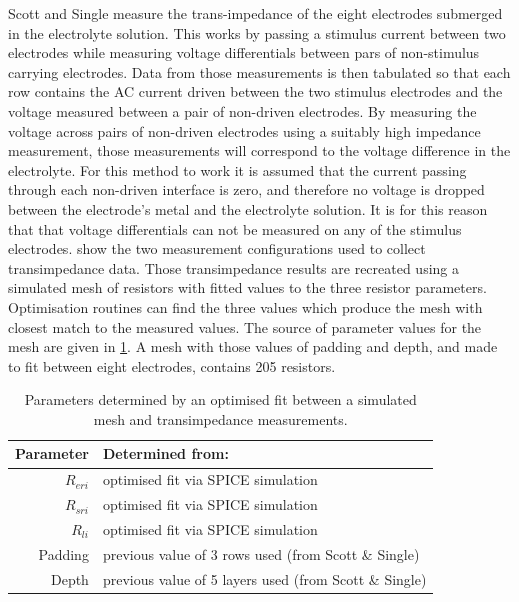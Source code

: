     Scott and Single measure the trans-impedance of the eight electrodes submerged in the electrolyte solution.
    This works by passing a stimulus current between two electrodes while measuring voltage differentials between pars of non-stimulus carrying electrodes.
    Data from those measurements is then tabulated so that each row contains the AC current driven between the two stimulus electrodes and the voltage measured between a pair of non-driven electrodes.
    By measuring the voltage across pairs of non-driven electrodes using a suitably high impedance measurement, those measurements will correspond to the voltage difference in the electrolyte.
    For this method to work it is assumed that the current passing through each non-driven interface is zero, and therefore no voltage is dropped between the electrode's metal and the electrolyte solution.
    It is for this reason that that voltage differentials can not be measured on any of the stimulus electrodes.
     show the two measurement configurations used to collect transimpedance data.
    Those transimpedance results are recreated using a simulated mesh of resistors with fitted values to the three resistor parameters.
    Optimisation routines can find the three values which produce the mesh with closest match to the measured values.
    The source of parameter values for the mesh are given in \cref{tab:pt2-parameterDesc-ResistorMesh}.
    A mesh with those values of padding and depth, and made to fit between eight electrodes, contains 205 resistors.


    \begin{table}
      \begin{center}
        \begin{tabular} {r | l}
          Parameter & Determined from:\\
          \hline
          $R_{eri}$ & optimised fit via SPICE simulation\\
          $R_{sri}$ & optimised fit via SPICE simulation\\
          $R_{li}$ & optimised fit via SPICE simulation\\
          Padding & previous value of 3 rows used (from Scott \& Single)\\
          Depth & previous value of 5 layers used (from Scott \& Single)
        \end{tabular}
      \end{center}
      \caption{\label{tab:pt2-parameterDesc-ResistorMesh}Parameters determined by an optimised fit between a simulated mesh and transimpedance measurements.}
    \end{table}

